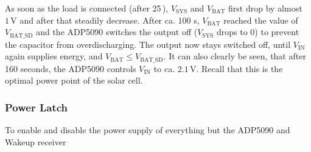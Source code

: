 As soon as the load is connected (after 25\,), $V_{\text{SYS}}$ and $V_{\text{BAT}}$ first drop by almost $1\,\text{V}$ and after that steadily decrease.
After ca. 100 s, $V_{\text{BAT}}$ reached the value of $V_{\text{BAT\_SD}}$ and the ADP5090 switches the output off ($V_{\text{SYS}}$ drops to 0) to prevent the capacitor from overdischarging.
The output now stays switched off, until $V_{\text{IN}}$ again supplies energy, and $V_{\text{BAT}} \le V_{\text{BAT\_SD}}$.
It can also clearly be seen, that after 160 seconds, the ADP5090 controls $V_{\text{IN}}$ to ca. $2.1\,\text{V}$. Recall that this is the optimal power point of the solar cell.

\subsubsection{Power Latch}

To enable and disable the power supply of everything but the ADP5090 and Wakeup receiver  

